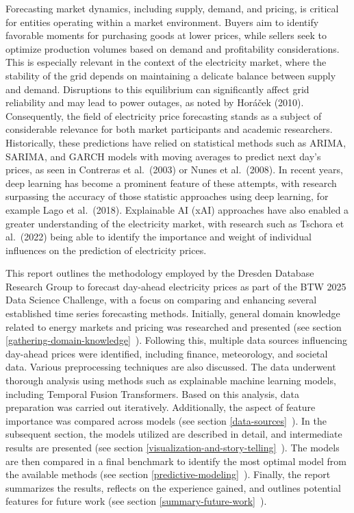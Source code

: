 \documentclass[a4paper]{article}
\begin{document}
    Forecasting market dynamics, including supply, demand, and pricing, is
critical for entities operating within a market environment. Buyers aim
to identify favorable moments for purchasing goods at lower prices,
while sellers seek to optimize production volumes based on demand and
profitability considerations. This is especially relevant in the context
of the electricity market, where the stability of the grid depends on
maintaining a delicate balance between supply and demand. Disruptions to
this equilibrium can significantly affect grid reliability and may lead
to power outages, as noted by Horáček (2010). Consequently, the field of
electricity price forecasting stands as a subject of considerable
relevance for both market participants and academic researchers.
Historically, these predictions have relied on statistical methods such
as ARIMA, SARIMA, and GARCH models with moving averages to predict next
day's prices, as seen in Contreras et al.~(2003) or Nunes et al.~(2008).
In recent years, deep learning has become a prominent feature of these
attempts, with research surpassing the accuracy of those statistic
approaches using deep learning, for example Lago et al.~(2018).
Explainable AI (xAI) approaches have also enabled a greater
understanding of the electricity market, with research such as Tschora
et al.~(2022) being able to identify the importance and weight of
individual influences on the prediction of electricity prices.

This report outlines the methodology employed by the Dresden Database
Research Group to forecast day-ahead electricity prices as part of the
BTW 2025 Data Science Challenge, with a focus on comparing and enhancing
several established time series forecasting methods. Initially, general
domain knowledge related to energy markets and pricing was researched
and presented (see section \ref{gathering-domain-knowledge}~). Following
this, multiple data sources influencing day-ahead prices were
identified, including finance, meteorology, and societal data. Various
preprocessing techniques are also discussed. The data underwent thorough
analysis using methods such as explainable machine learning models,
including Temporal Fusion Transformers. Based on this analysis, data
preparation was carried out iteratively. Additionally, the aspect of
feature importance was compared across models (see section \ref{data-sources}~). In the subsequent section, the models utilized are described
in detail, and intermediate results are presented (see section \ref{visualization-and-story-telling}~). The models are then compared in a final
benchmark to identify the most optimal model from the available methods
(see section \ref{predictive-modeling}~). Finally, the report summarizes the
results, reflects on the experience gained, and outlines potential
features for future work (see section \ref{summary-future-work}~).
\end{document}
